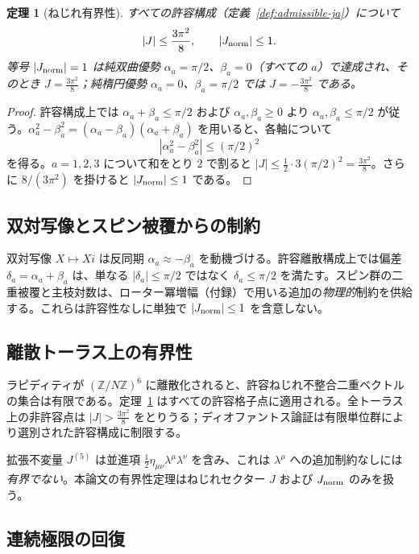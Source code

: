 \documentclass[dvipdfmx,a4paper]{article}
\newtheorem{theorem}{定理}[section]
\theoremstyle{definition}
\theoremstyle{remark}
\newcommand{\Jnorm}{J_{\rm norm}}
\newcommand{\Jbound}{\frac{3\pi^2}{8}}
\begin{document}
\begin{theorem}[ねじれ有界性]
\label{thm:torsion-bound-ja}
すべての許容構成（定義~\ref{def:admissible-ja}）について
\[
|J| \leq \Jbound, \qquad |\Jnorm| \leq 1.
\]
等号 $|\Jnorm| = 1$ は純双曲優勢 $\alpha_a = \pi/2$、$\beta_a = 0$（すべての $a$）で達成され、そのとき $J = \Jbound$；純楕円優勢 $\alpha_a = 0$、$\beta_a = \pi/2$ では $J = -\Jbound$ である。
\end{theorem}

\begin{proof}
許容構成上では $\alpha_a + \beta_a \leq \pi/2$ および $\alpha_a,\beta_a \geq 0$ より $\alpha_a,\beta_a \leq \pi/2$ が従う。$\alpha_a^2 - \beta_a^2 = (\alpha_a - \beta_a)(\alpha_a + \beta_a)$ を用いると、各軸について
\[
|\alpha_a^2 - \beta_a^2| \leq (\pi/2)^2
\]
を得る。$a = 1,2,3$ について和をとり $2$ で割ると $|J| \leq \frac12 \cdot 3(\pi/2)^2 = \Jbound$。さらに $8/(3\pi^2)$ を掛けると $|\Jnorm| \leq 1$ である。
\end{proof}

\subsection{双対写像とスピン被覆からの制約}

双対写像 $X \mapsto Xi$ は反同期 $\alpha_a \approx -\beta_a$ を動機づける。許容離散構成上では偏差 $\delta_a = \alpha_a + \beta_a$ は、単なる $|\delta_a| \leq \pi/2$ ではなく $\delta_a \leq \pi/2$ を満たす。スピン群の二重被覆と主枝対数は、ローター冪増幅（付録）で用いる追加の\emph{物理的}制約を供給する。これらは許容性なしに単独で $|\Jnorm| \leq 1$ を含意しない。

\subsection{離散トーラス上の有界性}

ラピディティが $(\mathbb{Z}/N\mathbb{Z})^6$ に離散化されると、許容ねじれ不整合二重ベクトルの集合は有限である。定理~\ref{thm:torsion-bound-ja} はすべての許容格子点に適用される。全トーラス上の非許容点は $|J| > \Jbound$ をとりうる；ディオファントス論証は有限単位群により選別された許容構成に制限する。

拡張不変量 $J^{(5)}$ は並進項 $\frac12 \eta_{\mu\nu}\lambda^\mu\lambda^\nu$ を含み、これは $\lambda^\mu$ への追加制約なしには\emph{有界でない}。本論文の有界性定理はねじれセクター $J$ および $\Jnorm$ のみを扱う。

\subsection{連続極限の回復}
\end{document}
